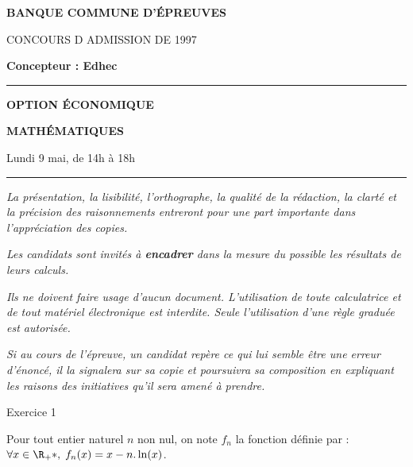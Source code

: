 \documentclass[11pt]{article}%
\begin{document}

\begin{center}
{\LARG\E\textbf{BANQUE COMMUNE D'ÉPREUVES}}



{\large \textsc{CONCOURS D ADMISSION DE 1997}}



{\large \textbf{Concepteur : Edhec}}



\rule{2.39cm}{0.05cm}



{\Large \textbf{OPTION ÉCONOMIQUE}}



{\Large \textbf{MATHÉMATIQUES }}



{\Large Lundi 9 mai, de 14h à 18h}



\rule{2.39cm}{0.05cm}
\end{center}

\textit{La présentation, la lisibilité, l'orthographe, la qualité
de la rédaction, la clarté et la précision des raisonnements
entreront pour une part importante dans l'appréciation des copies.}

\textit{Les candidats sont invités à \textbf{encadrer} dans la mesure
du possible les résultats de leurs calculs.}

\textit{Ils ne doivent faire usage d'aucun document. L'utilisation de
toute
calculatrice et de tout matériel électronique est interdite. Seule
l'utilisation d'une règle graduée est autorisée.}

\textit{Si au cours de l'épreuve, un candidat repère ce qui lui semble
être une erreur d'énoncé, il la signalera sur sa copie et
poursuivra sa composition en expliquant les raisons des initiatives
qu'il sera
amené à prendre.}

\vspace*{3cm}

{\Large Exercice 1}

Pour tout entier naturel $n$ non nul, on note $f_{n}$ la fonction
définie par : $\forall x\in \R_{+}{*},\;f_{n}(x) = x-n.\ln (x)$.
\end{document}
